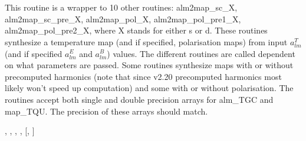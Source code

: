 
\sloppy


\section[alm2map*]{ }
\label{sub:alm2map}
\author{Eric Hivon, Frode K.~Hansen}

\begin{facility}
{This routine is a wrapper to 10 other routines: alm2map\_sc\_X,
  alm2map\_sc\_pre\_X, alm2map\_pol\_X, alm2map\_pol\_pre1\_X,
  alm2map\_pol\_pre2\_X, where X stands for either s or d. These routines
  synthesize a  temperature map (and if specified, polarisation maps) 
from input $a_{lm}^T$ (and if specified $a_{lm}^E$ and $a_{lm}^B$) values. 
The different routines are called dependent on what parameters are passed. 
Some routines synthesize maps with or without precomputed harmonics (note that
since \healpix v2.20 precomputed harmonics most likely won't speed up computation)
and some with or without polarisation.
The routines accept both single and double precision arrays for alm\_TGC and
  map\_TQU. The precision of these arrays should match.}
{\modAlmTools}
\end{facility}

\begin{f90format}
{%
, %
, %
, %
, %
 [, %
]}
\end{f90format}

